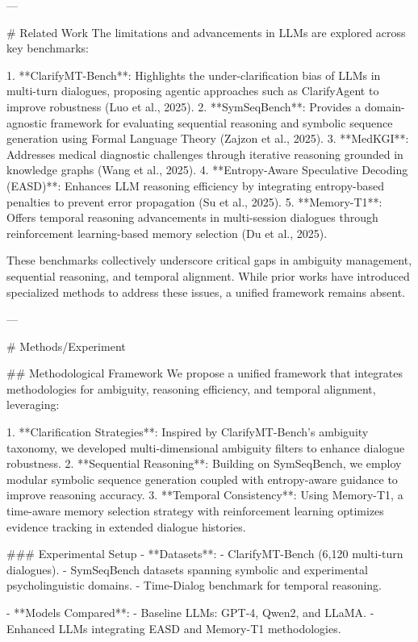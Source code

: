 ---

# Related Work  
The limitations and advancements in LLMs are explored across key benchmarks:  

1. **ClarifyMT-Bench**: Highlights the under-clarification bias of LLMs in multi-turn dialogues, proposing agentic approaches such as ClarifyAgent to improve robustness (Luo et al., 2025).  
2. **SymSeqBench**: Provides a domain-agnostic framework for evaluating sequential reasoning and symbolic sequence generation using Formal Language Theory (Zajzon et al., 2025).  
3. **MedKGI**: Addresses medical diagnostic challenges through iterative reasoning grounded in knowledge graphs (Wang et al., 2025).  
4. **Entropy-Aware Speculative Decoding (EASD)**: Enhances LLM reasoning efficiency by integrating entropy-based penalties to prevent error propagation (Su et al., 2025).  
5. **Memory-T1**: Offers temporal reasoning advancements in multi-session dialogues through reinforcement learning-based memory selection (Du et al., 2025).  

These benchmarks collectively underscore critical gaps in ambiguity management, sequential reasoning, and temporal alignment. While prior works have introduced specialized methods to address these issues, a unified framework remains absent.

---

# Methods/Experiment  

## Methodological Framework  
We propose a unified framework that integrates methodologies for ambiguity, reasoning efficiency, and temporal alignment, leveraging:  

1. **Clarification Strategies**: Inspired by ClarifyMT-Bench's ambiguity taxonomy, we developed multi-dimensional ambiguity filters to enhance dialogue robustness.  
2. **Sequential Reasoning**: Building on SymSeqBench, we employ modular symbolic sequence generation coupled with entropy-aware guidance to improve reasoning accuracy.  
3. **Temporal Consistency**: Using Memory-T1, a time-aware memory selection strategy with reinforcement learning optimizes evidence tracking in extended dialogue histories.

### Experimental Setup  
- **Datasets**:  
   - ClarifyMT-Bench (6,120 multi-turn dialogues).  
   - SymSeqBench datasets spanning symbolic and experimental psycholinguistic domains.  
   - Time-Dialog benchmark for temporal reasoning.  

- **Models Compared**:  
   - Baseline LLMs: GPT-4, Qwen2, and LLaMA.  
   - Enhanced LLMs integrating EASD and Memory-T1 methodologies.  

